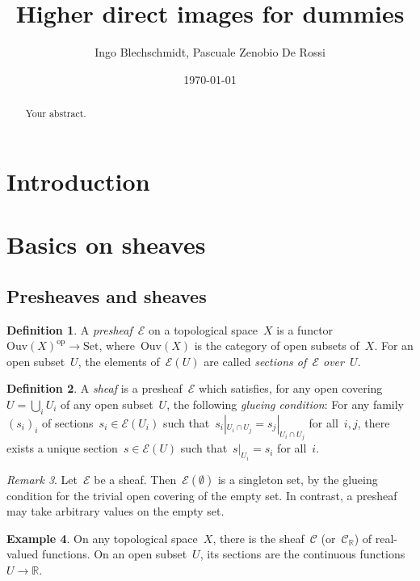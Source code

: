 \documentclass[10pt]{amsart}
\title{Higher direct images for dummies}
\author{Ingo Blechschmidt, Pascuale Zenobio De Rossi}
\date{\today}
\theoremstyle{definition}
\newtheorem{defn}{Definition}[section]
\newtheorem{ex}[defn]{Example}
\theoremstyle{plain}
\theoremstyle{remark}
\newtheorem{rem}[defn]{Remark}
\newcommand{\C}{\mathcal{C}}
\newcommand{\E}{\mathcal{E}}
\newcommand{\RR}{\mathbb{R}}
\newcommand{\Set}{\mathrm{Set}}
\newcommand{\Ouv}{\mathrm{Ouv}}
\newcommand{\op}{\mathrm{op}}
\begin{document}
\begin{abstract}
Your abstract.
\end{abstract}

\maketitle

\section{Introduction}

\section{Basics on sheaves}

\subsection{Presheaves and sheaves}

\begin{defn}A \emph{presheaf}~$\E$ on a topological space~$X$ is a
functor~$\Ouv(X)^\op \to \Set$, where~$\Ouv(X)$ is the category of open subsets
of~$X$. For an open subset~$U$, the elements of~$\E(U)$ are called
\emph{sections of~$\E$ over~$U$}.\end{defn}

\begin{defn}A \emph{sheaf} is a presheaf~$\E$ which satisfies, for any open covering~$U
= \bigcup_i U_i$ of any open subset~$U$, the following \emph{glueing
condition}: For any family~$(s_i)_i$ of sections~$s_i \in \E(U_i)$ such
that~$s_i|_{U_i \cap U_j} = s_j|_{U_i \cap U_j}$ for all~$i,j$, there exists a
unique section~$s \in \E(U)$ such that~$s|_{U_i} = s_i$ for all~$i$.
\end{defn}

\begin{rem}Let~$\E$ be a sheaf. Then~$\E(\emptyset)$ is a singleton set, by the
glueing condition for the trivial open covering of the empty set. In contrast,
a presheaf may take arbitrary values on the empty set.\end{rem}

\begin{ex}On any topological space~$X$, there is the sheaf~$\C$ (or~$\C_\RR$) of
real-valued functions. On an open subset~$U$, its sections are the continuous
functions~$U \to \RR$.
\end{ex}
\end{document}
